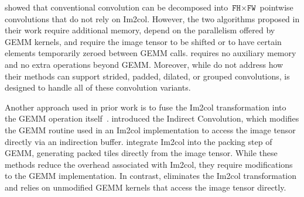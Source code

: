 \citet{Anderson2020} showed that conventional convolution can be decomposed into $\texttt{FH}\times\texttt{FW}$ pointwise convolutions that do not rely on Im2col.
However, the two algorithms proposed in their work require additional memory, depend on the parallelism offered by GEMM kernels, and require the image tensor to be shifted or to have certain elements temporarily zeroed between GEMM calls.
\algname requires no auxiliary memory and no extra operations beyond GEMM.
Moreover, while \citet{Anderson2020} do not address how their methods can support strided, padded, dilated, or grouped convolutions, \algname is designed to handle all of these convolution variants.

Another approach used in prior work is to fuse the Im2col transformation into the GEMM operation itself~\cite{Wang2019,Dukhan2019,Juan2020,Zhao2023}.
\citet{Dukhan2019} introduced the Indirect Convolution, which modifies the GEMM routine used in an Im2col implementation to access the image tensor directly via an indirection buffer.
\citet{Juan2020} integrate Im2col into the packing step of GEMM, generating packed tiles directly from the image tensor.
While these methods reduce the overhead associated with Im2col, they require modifications to the GEMM implementation.
In contrast, \algname eliminates the Im2col transformation and relies on unmodified GEMM kernels that access the image tensor directly.

